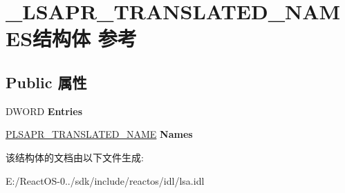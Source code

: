 \hypertarget{struct___l_s_a_p_r___t_r_a_n_s_l_a_t_e_d___n_a_m_e_s}{}\section{\+\_\+\+L\+S\+A\+P\+R\+\_\+\+T\+R\+A\+N\+S\+L\+A\+T\+E\+D\+\_\+\+N\+A\+M\+E\+S结构体 参考}
\label{struct___l_s_a_p_r___t_r_a_n_s_l_a_t_e_d___n_a_m_e_s}
\subsection*{Public 属性}
\begin{DoxyCompactItemize}
\item 
\mbox{\label{struct___l_s_a_p_r___t_r_a_n_s_l_a_t_e_d___n_a_m_e_s_ac103c732b69100197ccc0fba44138583}} 
D\+W\+O\+RD {\bfseries Entries}
\item 
\mbox{\label{struct___l_s_a_p_r___t_r_a_n_s_l_a_t_e_d___n_a_m_e_s_a0ef1ddbc35e873ad1647253fda95eb8c}} 
\hyperlink{struct___l_s_a_p_r___t_r_a_n_s_l_a_t_e_d___n_a_m_e}{P\+L\+S\+A\+P\+R\+\_\+\+T\+R\+A\+N\+S\+L\+A\+T\+E\+D\+\_\+\+N\+A\+ME} {\bfseries Names}
\end{DoxyCompactItemize}


该结构体的文档由以下文件生成\+:\begin{DoxyCompactItemize}
\item 
E\+:/\+React\+O\+S-\/0../sdk/include/reactos/idl/lsa.\+idl\end{DoxyCompactItemize}

